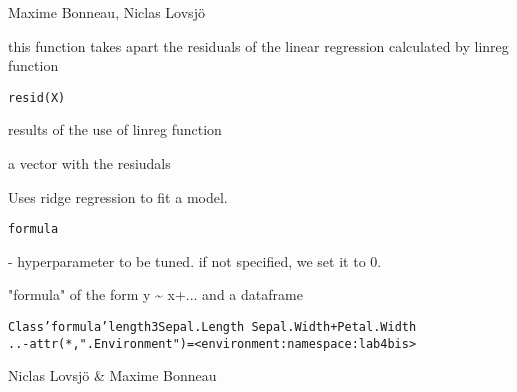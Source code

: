 \documentclass[a4paper]{book}
\begin{document}
%
\begin{Author}\relax
Maxime Bonneau, Niclas Lovsjö
\end{Author}
%
\begin{Description}\relax
this function takes apart the residuals of the linear regression
calculated by linreg function
\end{Description}
%
\begin{Usage}
\begin{verbatim}
resid(X)
\end{verbatim}
\end{Usage}
%
\begin{Arguments}
\begin{ldescription}
\item[\code{what}] results of the use of linreg function
\end{ldescription}
\end{Arguments}
%
\begin{Value}
a vector with the resiudals
\end{Value}
%
\begin{Description}\relax
Uses ridge regression to fit a model.
\end{Description}
%
\begin{Usage}
\begin{verbatim}
formula
\end{verbatim}
\end{Usage}
%
\begin{Arguments}
\begin{ldescription}
\item[\code{lambda}] - hyperparameter to be tuned. if not specified, we set it to 0.

\item[\code{a}] "formula" of the form y \textasciitilde{} x+... and a dataframe
\end{ldescription}
\end{Arguments}
%
\begin{Format}
\begin{alltt}Class 'formula' length 3 Sepal.Length ~ Sepal.Width + Petal.Width
  ..- attr(*, ".Environment")=<environment: namespace:lab4bis> 
\end{alltt}
\end{Format}
%
\begin{Author}\relax
Niclas Lovsjö \& Maxime Bonneau
\end{Author}
\end{document}
